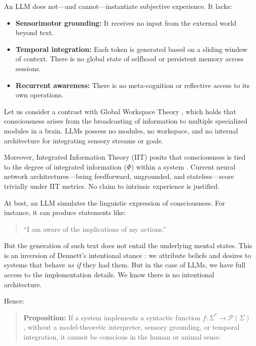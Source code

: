 \documentclass[12pt]{article}
\theoremstyle{plain}
\theoremstyle{definition}
\theoremstyle{remark}
\begin{document}
An LLM does not—and cannot—instantiate subjective experience. It lacks:

\begin{itemize}
    \item \textbf{Sensorimotor grounding:} It receives no input from the external world beyond text.
    \item \textbf{Temporal integration:} Each token is generated based on a sliding window of context. There is no global state of selfhood or persistent memory across sessions.
    \item \textbf{Recurrent awareness:} There is no meta-cognition or reflective access to its own operations.
\end{itemize}

Let us consider a contrast with Global Workspace Theory \parencite{baars1988cognitive}, which holds that consciousness arises from the broadcasting of information to multiple specialized modules in a brain. LLMs possess no modules, no workspace, and no internal architecture for integrating sensory streams or goals.

Moreover, Integrated Information Theory (IIT) posits that consciousness is tied to the degree of integrated information ($\Phi$) within a system \parencite{tononi2004information}. Current neural network architectures—being feedforward, ungrounded, and stateless—score trivially under IIT metrics. No claim to intrinsic experience is justified.

At best, an LLM simulates the linguistic expression of consciousness. For instance, it can produce statements like:

\begin{quote}
    “I am aware of the implications of my actions.”
\end{quote}

But the generation of such text does not entail the underlying mental states. This is an inversion of Dennett’s intentional stance \parencite{dennett1989intentional}: we attribute beliefs and desires to systems that behave \textit{as if} they had them. But in the case of LLMs, we have full access to the implementation details. We know there is no intentional architecture.

Hence:

\begin{quote}
    \textbf{Proposition:} If a system implements a syntactic function \( f: \Sigma^* \rightarrow \mathcal{P}(\Sigma) \), without a model-theoretic interpreter, sensory grounding, or temporal integration, it cannot be conscious in the human or animal sense.
\end{quote}
\end{document}
